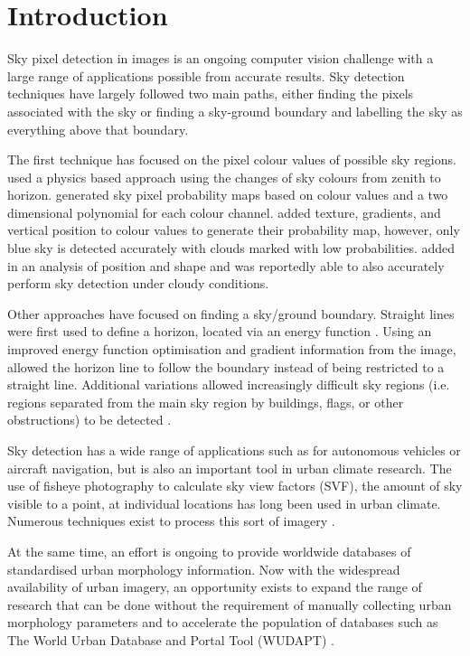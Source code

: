 \documentclass[final,3p,times,authoryear]{elsarticle}
\begin{document}
\section{Introduction}\label{sec:introduction}
Sky pixel detection in images is an ongoing computer vision challenge with a large range of applications possible from accurate results. Sky detection techniques have largely followed two main paths, either finding the pixels associated with the sky or finding a sky-ground boundary and labelling the sky as everything above that boundary. 

The first technique has focused on the pixel colour values of possible sky regions. \cite{Luo2002} used a physics based approach using the changes of sky colours from zenith to horizon. \cite{Gallagher2004} generated sky pixel probability maps based on colour values and a two dimensional polynomial for each colour channel. \cite{Zafarifar2007} added texture, gradients, and vertical position to colour values to generate their probability map, however, only blue sky is detected accurately with clouds marked with low probabilities. \cite{Schmitt2009} added in an analysis of position and shape and was reportedly able to also accurately perform sky detection under cloudy conditions. 

Other approaches have focused on finding a sky/ground boundary. Straight lines were first used to define a horizon, located via an energy function \citep{Ettinger2003}. Using an improved energy function optimisation and gradient information from the image, \cite{Shen2013} allowed the horizon line to follow the boundary instead of being restricted to a straight line. Additional variations allowed increasingly difficult sky regions (i.e. regions separated from the main sky region by buildings, flags, or other obstructions) to be detected \citep{Zhijie2014,Zhijie2015}.

Sky detection has a wide range of applications such as for autonomous vehicles or aircraft navigation, but is also an important tool in urban climate research. The use of fisheye photography to calculate sky view factors (SVF), the amount of sky visible to a point, at individual locations has long been used in urban climate. Numerous techniques exist to process this sort of imagery \citep{Grimmond2001,Chapman2004,Ali-Toudert2007}. 

At the same time, an effort is ongoing to provide worldwide databases of standardised urban morphology information. Now with the widespread availability of urban imagery, an opportunity exists to expand the range of research that can be done without the requirement of manually collecting urban morphology parameters and to accelerate the population of databases such as The World Urban Database and Portal Tool (WUDAPT) \citep{Mills2015}.
\end{document}
